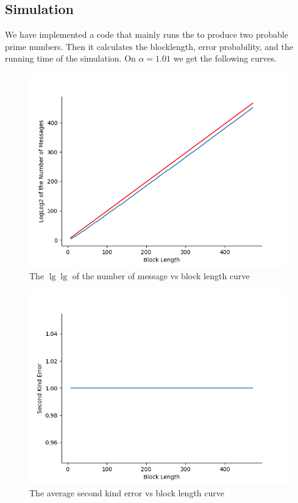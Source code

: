 \subsection{Simulation}
We have implemented a code that mainly runs the  to produce two probable prime numbers. Then it calculates the blocklength, error probability, and the running time of the simulation. On \(\alpha = 1.01\) we get the following curves.
\begin{figure}
	\includegraphics*[height = 0.4 \textheight]{graphic/primarymessage.png}
	\caption{The \(\lg \lg \) of the number of message vs block length curve}
\end{figure}
\begin{figure}
	\includegraphics*[height = 0.4 \textheight]{graphic/primaryerror.png}
	\caption{The average second kind error vs block length curve}
\end{figure}
